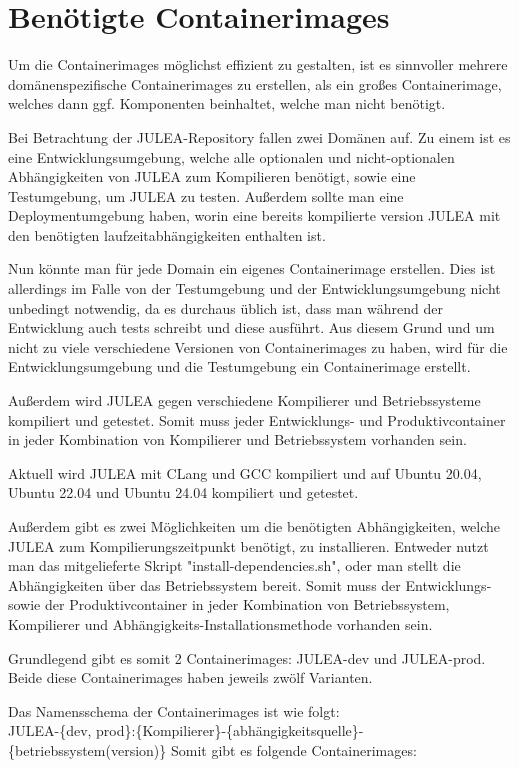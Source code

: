 \section{Benötigte Containerimages}

Um die Containerimages möglichst effizient zu gestalten, ist es sinnvoller mehrere domänenspezifische Containerimages zu erstellen, als ein großes Containerimage, welches dann ggf. Komponenten beinhaltet, welche man nicht benötigt.

Bei Betrachtung der JULEA-Repository fallen zwei Domänen auf. Zu einem ist es eine Entwicklungsumgebung, welche alle optionalen und nicht-optionalen Abhängigkeiten von JULEA zum Kompilieren benötigt, sowie eine Testumgebung, um JULEA zu testen. Außerdem sollte man eine Deploymentumgebung haben, worin eine bereits kompilierte version JULEA mit den benötigten laufzeitabhängigkeiten enthalten ist.

Nun könnte man für jede Domain ein eigenes Containerimage erstellen. Dies ist allerdings im Falle von der Testumgebung und der Entwicklungsumgebung nicht unbedingt notwendig, da es durchaus üblich ist, dass man während der Entwicklung auch tests schreibt und diese ausführt. Aus diesem Grund und um nicht zu viele verschiedene Versionen von Containerimages zu haben, wird für die Entwicklungsumgebung und die Testumgebung ein Containerimage erstellt.

Außerdem wird JULEA gegen verschiedene Kompilierer und Betriebssysteme kompiliert und getestet. Somit muss jeder Entwicklungs- und Produktivcontainer in jeder Kombination von Kompilierer und Betriebssystem vorhanden sein. 

Aktuell wird JULEA mit CLang und GCC kompiliert und auf Ubuntu 20.04, Ubuntu 22.04 und Ubuntu 24.04 kompiliert und getestet.

Außerdem gibt es zwei Möglichkeiten um die benötigten Abhängigkeiten, welche JULEA zum Kompilierungszeitpunkt benötigt, zu installieren. Entweder nutzt man das mitgelieferte Skript "install-dependencies.sh", oder man stellt die Abhängigkeiten über das Betriebssystem bereit. Somit muss der Entwicklungs- sowie der Produktivcontainer in jeder Kombination von Betriebssystem, Kompilierer und Abhängigkeits-Installationsmethode vorhanden sein.

Grundlegend gibt es somit 2 Containerimages: JULEA-dev und JULEA-prod. Beide diese Containerimages haben jeweils zwölf Varianten.

Das Namensschema der Containerimages ist wie folgt: \\
JULEA-\{dev, prod\}:\{Kompilierer\}-\{abhängigkeitsquelle\}-\{betriebssystem(version)\}
Somit gibt es folgende Containerimages:


